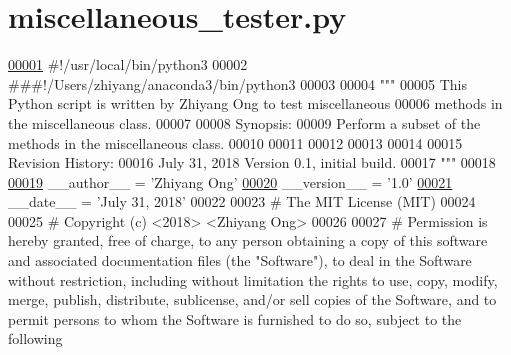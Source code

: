 \hypertarget{miscellaneous__tester_8py_source}{}\section{miscellaneous\+\_\+tester.\+py}
\label{miscellaneous__tester_8py_source}

\begin{DoxyCode}
\hypertarget{miscellaneous__tester_8py_source_l00001}{}\hyperlink{namespaceutilities_1_1miscellaneous__tester}{00001} \textcolor{comment}{#!/usr/local/bin/python3}
00002 \textcolor{comment}{###!/Users/zhiyang/anaconda3/bin/python3}
00003 
00004 \textcolor{stringliteral}{"""}
00005 \textcolor{stringliteral}{    This Python script is written by Zhiyang Ong to test miscellaneous}
00006 \textcolor{stringliteral}{        methods in the miscellaneous class.}
00007 \textcolor{stringliteral}{}
00008 \textcolor{stringliteral}{    Synopsis:}
00009 \textcolor{stringliteral}{    Perform a subset of the methods in the miscellaneous class.}
00010 \textcolor{stringliteral}{}
00011 \textcolor{stringliteral}{}
00012 \textcolor{stringliteral}{}
00013 \textcolor{stringliteral}{}
00014 \textcolor{stringliteral}{}
00015 \textcolor{stringliteral}{    Revision History:}
00016 \textcolor{stringliteral}{    July 31, 2018           Version 0.1, initial build.}
00017 \textcolor{stringliteral}{"""}
00018 
\hypertarget{miscellaneous__tester_8py_source_l00019}{}\hyperlink{namespaceutilities_1_1miscellaneous__tester_a1a0c5633611c3237a48f9d89ede7afdb}{00019} \_\_author\_\_ = \textcolor{stringliteral}{'Zhiyang Ong'}
\hypertarget{miscellaneous__tester_8py_source_l00020}{}\hyperlink{namespaceutilities_1_1miscellaneous__tester_a5cf71bb548a296685a4ce1abafa02ad4}{00020} \_\_version\_\_ = \textcolor{stringliteral}{'1.0'}
\hypertarget{miscellaneous__tester_8py_source_l00021}{}\hyperlink{namespaceutilities_1_1miscellaneous__tester_a809790ee7c8c8154544259eed38d29b4}{00021} \_\_date\_\_ = \textcolor{stringliteral}{'July 31, 2018'}
00022 
00023 \textcolor{comment}{#   The MIT License (MIT)}
00024 
00025 \textcolor{comment}{#   Copyright (c) <2018> <Zhiyang Ong>}
00026 
00027 \textcolor{comment}{#   Permission is hereby granted, free of charge, to any person obtaining a copy of this software and
       associated documentation files (the "Software"), to deal in the Software without restriction, including without
       limitation the rights to use, copy, modify, merge, publish, distribute, sublicense, and/or sell copies of the
       Software, and to permit persons to whom the Software is furnished to do so, subject to the following
}
\end{DoxyCode}
